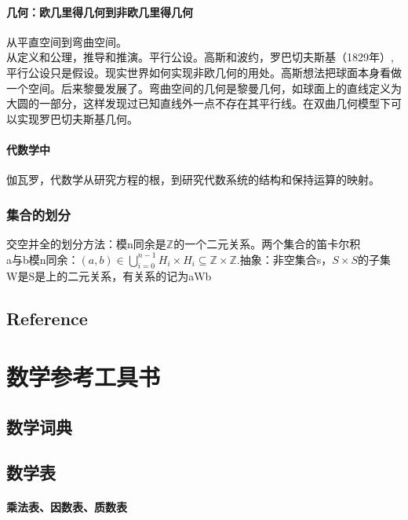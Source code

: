 \documentclass[UTF8]{../09-Mathematics}
\begin{document}
\subsubsection{几何：欧几里得几何到非欧几里得几何}
从平直空间到弯曲空间。\\
从定义和公理，推导和推演。平行公设。高斯和波约，罗巴切夫斯基（1829年）,平行公设只是假设。现实世界如何实现非欧几何的用处。高斯想法把球面本身看做一个空间。后来黎曼发展了。弯曲空间的几何是黎曼几何，如球面上的直线定义为大圆的一部分，这样发现过已知直线外一点不存在其平行线。在双曲几何模型下可以实现罗巴切夫斯基几何。\\
\subsubsection{代数学中}
伽瓦罗，代数学从研究方程的根，到研究代数系统的结构和保持运算的映射。

\subsection{集合的划分}
交空并全的划分方法：模n同余是$\mathbb Z$的一个二元关系。两个集合的笛卡尔积\\
a与b模n同余：$(a,b) \in \bigcup _{i=0}^{n-1} H_i \times H_i \subseteq \mathbb Z \times \mathbb Z$.抽象：非空集合s，$S\times S$的子集W是S是上的二元关系，有关系的记为aWb\\





\section{Reference}






\chapter{数学参考工具书}

\section{数学词典}

\section{数学表}
    \subsubsection{乘法表、因数表、质数表}
\end{document}
